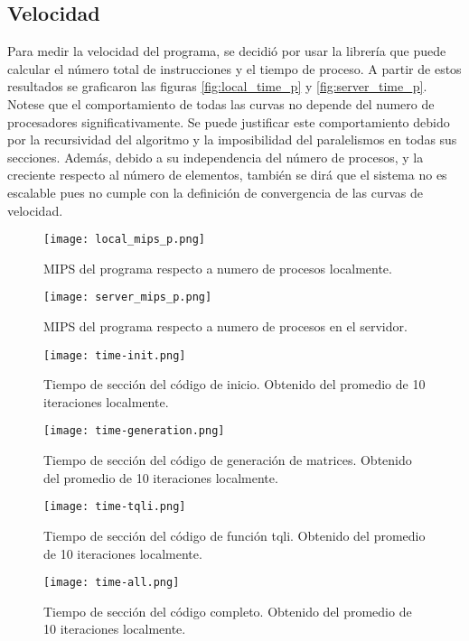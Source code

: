 \subsection{Velocidad}
Para medir la velocidad del programa, se decidió por usar la librería  que puede calcular el número total de instrucciones y el tiempo de proceso. A partir de estos resultados se graficaron las figuras \ref{fig:local_time_p} y \ref{fig:server_time_p}. Notese que el comportamiento de todas las curvas no depende del numero de procesadores significativamente. Se puede justificar este comportamiento debido por la recursividad del algoritmo y la imposibilidad del paralelismos en todas sus secciones. Además, debido a su independencia del número de procesos, y la creciente respecto al número de elementos, también se dirá que el sistema no es escalable pues no cumple con la definición de convergencia de las curvas de velocidad.





\begin{figure}
	\centering
	\texttt{[image: local\_mips\_p.png]}
	\caption{MIPS del programa respecto a numero de procesos localmente.}
	\label{fig:local_mips_p}
\end{figure}



\begin{figure}
	\centering
	\texttt{[image: server\_mips\_p.png]}
	\caption{MIPS del programa respecto a numero de procesos en el servidor.}
	\label{fig:server_mips_p}
\end{figure}

\begin{figure}
	\centering
	\texttt{[image: time-init.png]}
	\caption{Tiempo de sección del código de inicio. Obtenido del promedio de 10 iteraciones localmente.}
	\label{fig:time-init}
\end{figure}

\begin{figure}
	\centering
	\texttt{[image: time-generation.png]}
	\caption{Tiempo de sección del código de generación de matrices. Obtenido del promedio de 10 iteraciones localmente.}
	\label{fig:time-generation}
\end{figure}

\begin{figure}
	\centering
	\texttt{[image: time-tqli.png]}
	\caption{Tiempo de sección del código de función tqli. Obtenido del promedio de 10 iteraciones localmente.}
	\label{fig:time-tqli}
\end{figure}

\begin{figure}
	\centering
	\texttt{[image: time-all.png]}
	\caption{Tiempo de sección del código completo. Obtenido del promedio de 10 iteraciones localmente.}
	\label{fig:time-all}
\end{figure}